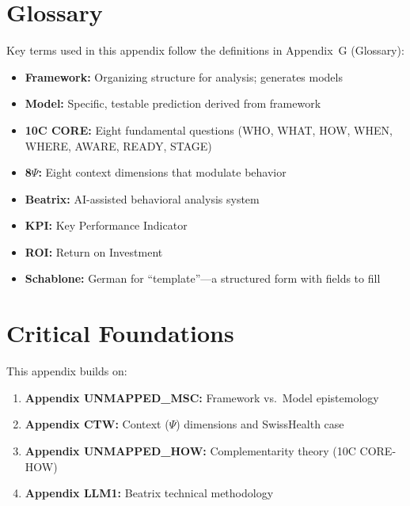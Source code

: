 

\section{Glossary}
\label{sec:consulting-glossary}

Key terms used in this appendix follow the definitions in Appendix~G (Glossary):
\begin{itemize}[nosep]
    \item \textbf{Framework:} Organizing structure for analysis; generates models
    \item \textbf{Model:} Specific, testable prediction derived from framework
    \item \textbf{10C CORE:} Eight fundamental questions (WHO, WHAT, HOW, WHEN, WHERE, AWARE, READY, STAGE)
    \item \textbf{8$\Psi$:} Eight context dimensions that modulate behavior
    \item \textbf{Beatrix:} AI-assisted behavioral analysis system
    \item \textbf{KPI:} Key Performance Indicator
    \item \textbf{ROI:} Return on Investment
    \item \textbf{Schablone:} German for ``template''---a structured form with fields to fill
\end{itemize}


\section{Critical Foundations}
\label{sec:consulting-foundations}

This appendix builds on:
\begin{enumerate}[nosep]
    \item \textbf{Appendix UNMAPPED_MSC:} Framework vs.\ Model epistemology
    \item \textbf{Appendix CTW:} Context ($\Psi$) dimensions and SwissHealth case
    \item \textbf{Appendix UNMAPPED_HOW:} Complementarity theory (10C CORE-HOW)
    \item \textbf{Appendix LLM1:} Beatrix technical methodology
\end{enumerate}


